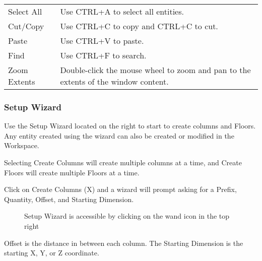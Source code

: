 \documentclass[letterpaper,10pt,english]{sphinxmanual}
\begin{document}
\begin{savenotes}\sphinxattablestart
\centering
\begin{tabulary}{\linewidth}[t]{|T|T|}
\hline
\sphinxstyletheadfamily 
{}
&\sphinxstyletheadfamily 
{}
\\
\hline
Select All
&
Use CTRL+A to select all entities.
\\
\hline
Cut/Copy
&
Use CTRL+C to copy and CTRL+C to cut.
\\
\hline
Paste
&
Use CTRL+V to paste.
\\
\hline
Find
&
Use CTRL+F to search.
\\
\hline
Zoom Extents
&
Double-click the mouse wheel to zoom and pan to the extents of the window content.
\\
\hline
\end{tabulary}
\par
\sphinxattableend\end{savenotes}


\subsubsection{Setup Wizard}
\label{\detokenize{docs/userguide/definingarchitecturalelements/floorplans/index-floor-plans:setup-wizard}}
Use the Setup Wizard located on the right to start to create columns and Floors.  Any entity created using the wizard can also be created or modified in the {\hyperref[\detokenize{docs/userguide/definingarchitecturalelements/archelements/index-arch-elements:arch-elements}]{}} Workspace.

Selecting Create Columns will create multiple columns at a time, and Create Floors will create multiple Floors at a time.

Click on Create Columns (X) and a wizard will prompt asking for a Prefix, Quantity, Offset, and Starting Dimension.

\begin{figure}[H]
\centering
\capstart

\noindent{}
\caption{Setup Wizard is accessible by clicking on the wand icon in the top right}\label{\detokenize{docs/userguide/definingarchitecturalelements/floorplans/index-floor-plans:id1}}\end{figure}

Offset is the distance in between each column.  The Starting Dimension is the starting X, Y, or Z coordinate.
\end{document}
